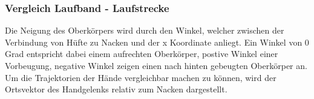 \subsubsection{Vergleich Laufband - Laufstrecke}
Die Neigung des Oberkörpers wird durch den Winkel, welcher zwischen der Verbindung von Hüfte zu Nacken und der x Koordinate anliegt. Ein Winkel von 0 Grad entspricht dabei einem aufrechten Oberkörper, postive Winkel einer Vorbeugung, negative Winkel zeigen einen nach hinten gebeugten Oberkörper an. \\
Um die Trajektorien der Hände vergleichbar machen zu können, wird der Ortsvektor des Handgelenks relativ zum Nacken dargestellt. 






